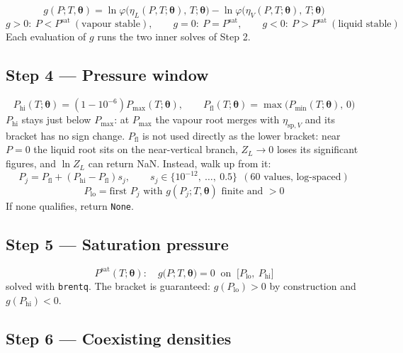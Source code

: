 \documentclass[11pt]{article}
\newcommand{\pth}{\boldsymbol{\theta}}
\newcommand{\etasv}{\eta_{\mathrm{sp},V}}
\begin{document}
\begin{equation}
g(P;T,\pth) = \ln\varphi\big(\eta_L(P,T;\pth),\,T;\pth\big) - \ln\varphi\big(\eta_V(P,T;\pth),\,T;\pth\big)
\end{equation}
\begin{equation}
g>0:\ P<P^{\mathrm{sat}}\ (\text{vapour stable}),\qquad
g=0:\ P=P^{\mathrm{sat}},\qquad
g<0:\ P>P^{\mathrm{sat}}\ (\text{liquid stable})
\end{equation}
Each evaluation of $g$ runs the two inner solves of Step 2.

\subsection*{Step 4 --- Pressure window}

\begin{equation}
P_{\mathrm{hi}}(T;\pth) = \left(1-10^{-6}\right)P_{\max}(T;\pth),
\qquad
P_{\mathrm{fl}}(T;\pth) = \max\!\big(P_{\min}(T;\pth),\,0\big)
\end{equation}
$P_{\mathrm{hi}}$ stays just below $P_{\max}$: at $P_{\max}$ the vapour root merges with $\etasv$ and its bracket has no sign change. $P_{\mathrm{fl}}$ is not used directly as the lower bracket: near $P=0$ the liquid root sits on the near-vertical branch, $Z_L\to0$ loses its significant figures, and $\ln Z_L$ can return NaN. Instead, walk up from it:
\begin{equation}
P_j = P_{\mathrm{fl}} + \left(P_{\mathrm{hi}}-P_{\mathrm{fl}}\right) s_j,
\qquad s_j \in \{10^{-12},\ \dots,\ 0.5\}\ \ (60 \text{ values, log-spaced})
\end{equation}
\begin{equation}
P_{\mathrm{lo}} = \text{first } P_j \text{ with } g(P_j;T,\pth) \text{ finite and } >0
\end{equation}
If none qualifies, return \texttt{None}.

\subsection*{Step 5 --- Saturation pressure}

\begin{equation}
P^{\mathrm{sat}}(T;\pth):\quad g\big(P;T,\pth\big)=0 \ \text{ on } \ \big[P_{\mathrm{lo}},\ P_{\mathrm{hi}}\big]
\end{equation}
solved with \texttt{brentq}. The bracket is guaranteed: $g(P_{\mathrm{lo}})>0$ by construction and $g(P_{\mathrm{hi}})<0$.

\subsection*{Step 6 --- Coexisting densities}
\end{document}
